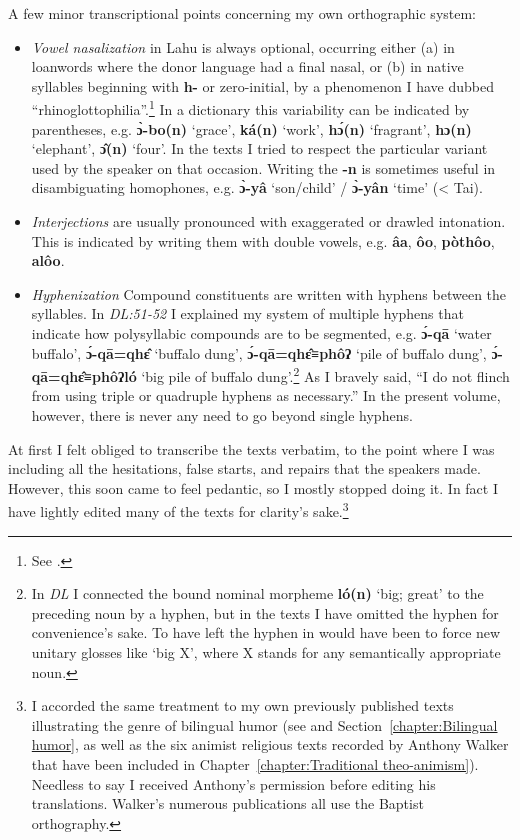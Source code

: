A few minor transcriptional points concerning my own orthographic system:

\begin{itemize}

\item
  \emph{Vowel nasalization} in Lahu is always optional, occurring
  either (a) in loanwords where the donor language had a final nasal,
  or (b) in native syllables beginning with \textbf{h-} or
  zero-initial, by a phenomenon I have dubbed
  ``rhinoglottophilia''.\footnote{See \citet{m75}.} In a dictionary
  this variability can be indicated by parentheses,
  e.g. \textbf{ɔ̀-bo(n)} `grace', \textbf{ká(n) }`work', \textbf{hɔ́(n)
  }`fragrant', \textbf{hɔ(n) }`elephant', \textbf{ɔ̂(n)} `four'. In the
  texts I tried to respect the particular variant used by the speaker
  on that occasion. Writing the \textbf{-n} is sometimes useful in
  disambiguating homophones, e.g. \textbf{ɔ̀-yâ} `son/child' /
  \textbf{ɔ̀-yân} `time' (\textless{} Tai).

\item
  \emph{Interjections }are usually pronounced with exaggerated or
  drawled intonation. This is indicated by writing them with double
  vowels, e.g.  \textbf{âa}, \textbf{ôo}, \textbf{pòthôo},\textbf{
    alôo}.

\item
  \emph{Hyphenization} Compound constituents are written with
  hyphens between the syllables. In \emph{DL:51-52} I explained my
  system of multiple hyphens that indicate how polysyllabic compounds
  are to be segmented, e.g. \textbf{ɔ́-qā} `water buffalo',
  \textbf{ɔ́-qā=qhɛ̂} `buffalo dung', \textbf{ɔ́-qā=qhɛ̂≡phôʔ} `pile of
  buffalo dung', \textbf{ɔ́-qā=qhɛ̂≡phôʔ\quadruplehyphen ló} `big pile of buffalo
  dung'.\footnote{In \emph{DL} I connected the bound nominal morpheme
    \textbf{ló(n)} `big; great' to the preceding noun by a hyphen, but in the
    texts I have omitted the hyphen for convenience's sake. To have
    left the hyphen in would have been to force new unitary glosses
    like `big X', where X stands for any semantically appropriate
    noun.} As I bravely said, ``I do not flinch from using triple or
  quadruple hyphens as necessary.'' In the present volume, however,
  there is never any need to go beyond single hyphens.

\end{itemize}

At first I felt obliged to transcribe the texts verbatim, to the point
where I was including all the hesitations, false starts, and repairs
that the speakers made. However, this soon came to feel pedantic, so I
mostly stopped doing it. In fact I have lightly edited many of the
texts for clarity's sake.\footnote{I accorded the same treatment to my
  own previously published texts illustrating the genre of bilingual
  humor (see \citet{matisoff1969lahu} and
  Section~\ref{chapter:Bilingual humor}, as well as the six animist
  religious texts recorded by Anthony Walker that have been included
  in Chapter~\ref{chapter:Traditional theo-animism}). Needless to say
  I received Anthony's permission before editing his
  translations. Walker's numerous publications all use the Baptist
  orthography.}


